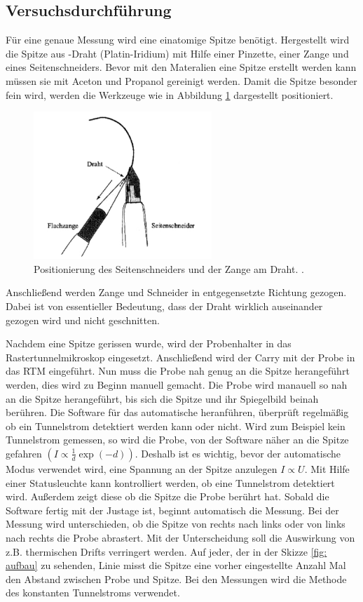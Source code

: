 \subsection{Versuchsdurchführung}

Für eine genaue Messung wird eine einatomige Spitze benötigt.
Hergestellt wird die Spitze aus -Draht (Platin-Iridium)
mit Hilfe einer Pinzette, einer Zange und eines Seitenschneiders.
Bevor mit den Materalien eine Spitze erstellt werden kann müssen sie mit Aceton und Propanol gereinigt werden.
Damit die Spitze besonder fein wird, werden die Werkzeuge wie in Abbildung \ref{fig: zange_schneider}
dargestellt positioniert.
\begin{figure}[!h]
  \centering
  \includegraphics[width=0.6\textwidth]{./pics/herstellung_spitze.png}
  \caption{Positionierung des Seitenschneiders und der Zange am Draht. \cite{anleitung_frankfurt}.}
  \label{fig: zange_schneider}
\end{figure}
Anschließend werden Zange und Schneider in entgegensetzte Richtung gezogen.
Dabei ist von essentieller Bedeutung, dass der Draht wirklich auseinander gezogen wird und
nicht geschnitten.

Nachdem eine Spitze gerissen wurde, wird der Probenhalter in das Rastertunnelmikroskop eingesetzt.
Anschließend wird der Carry mit der Probe in das RTM eingeführt.
Nun muss die Probe nah genug an die Spitze herangeführt werden, dies wird zu Beginn
manuell gemacht. Die Probe wird manauell so nah an die Spitze herangeführt, bis sich
die Spitze und ihr Spiegelbild beinah berühren. Die Software für das automatische
heranführen, überprüft regelmäßig ob ein Tunnelstrom detektiert werden kann oder nicht.
Wird zum Beispiel kein Tunnelstrom gemessen, so wird die Probe, von der Software
näher an die Spitze gefahren $\left(I\propto \frac{1}{d}\exp{(-d)}\right)$.
Deshalb ist es wichtig, bevor der automatische
Modus verwendet wird, eine Spannung an der Spitze anzulegen $I\propto U$. Mit Hilfe einer
Statusleuchte kann kontrolliert werden, ob eine Tunnelstrom detektiert wird. Außerdem zeigt diese
ob die Spitze die Probe berührt hat.
Sobald die Software fertig mit der Justage ist, beginnt automatisch die Messung.
Bei der Messung wird unterschieden, ob die Spitze von rechts nach links oder von links nach rechts
die Probe abrastert. Mit der Unterscheidung soll die Auswirkung von z.B. thermischen Drifts verringert werden.
 Auf jeder, der in der Skizze \ref{fig: aufbau} zu sehenden, Linie misst die Spitze eine
vorher eingestellte Anzahl Mal den Abstand zwischen Probe und Spitze.
Bei den Messungen wird die Methode des konstanten Tunnelstroms verwendet.

